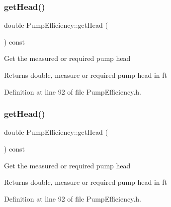 \mbox{\label{class_pump_efficiency_aa89f7727e67b3e0d20149eee66d10f69}} 
\subsubsection{\texorpdfstring{get\+Head()}{getHead()}\hspace{0.1cm}{\footnotesize\ttfamily [2/3]}}
{\footnotesize\ttfamily double Pump\+Efficiency\+::get\+Head (\begin{DoxyParamCaption}{ }\end{DoxyParamCaption}) const\hspace{0.3cm}{\ttfamily [inline]}}

Get the measured or required pump head

\begin{DoxyReturn}{Returns}
double, measure or required pump head in ft 
\end{DoxyReturn}


Definition at line 92 of file Pump\+Efficiency.\+h.

\mbox{\label{class_pump_efficiency_aa89f7727e67b3e0d20149eee66d10f69}} 
\subsubsection{\texorpdfstring{get\+Head()}{getHead()}\hspace{0.1cm}{\footnotesize\ttfamily [3/3]}}
{\footnotesize\ttfamily double Pump\+Efficiency\+::get\+Head (\begin{DoxyParamCaption}{ }\end{DoxyParamCaption}) const\hspace{0.3cm}{\ttfamily [inline]}}

Get the measured or required pump head

\begin{DoxyReturn}{Returns}
double, measure or required pump head in ft 
\end{DoxyReturn}


Definition at line 92 of file Pump\+Efficiency.\+h.

\mbox{\label{class_pump_efficiency_aeb6d4f2cce565fbe834d71c7a52b87d1}} 
